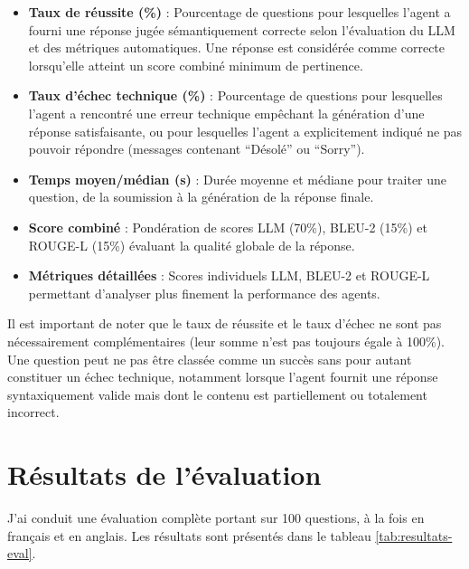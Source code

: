 \documentclass[a4paper,11pt]{article}
\begin{document}
\begin{itemize}
    \item \textbf{Taux de réussite (\%)} : Pourcentage de questions pour lesquelles l'agent a fourni une réponse jugée sémantiquement correcte selon l'évaluation du LLM et des métriques automatiques. Une réponse est considérée comme correcte lorsqu'elle atteint un score combiné minimum de pertinence.
    
    \item \textbf{Taux d'échec technique (\%)} : Pourcentage de questions pour lesquelles l'agent a rencontré une erreur technique empêchant la génération d'une réponse satisfaisante, ou pour lesquelles l'agent a explicitement indiqué ne pas pouvoir répondre (messages contenant \enquote{Désolé} ou \enquote{Sorry}).
    
    \item \textbf{Temps moyen/médian (s)} : Durée moyenne et médiane pour traiter une question, de la soumission à la génération de la réponse finale.
    
    \item \textbf{Score combiné} : Pondération de scores LLM (70\%), BLEU-2 (15\%) et ROUGE-L (15\%) évaluant la qualité globale de la réponse.
    
    \item \textbf{Métriques détaillées} : Scores individuels LLM, BLEU-2 et ROUGE-L permettant d'analyser plus finement la performance des agents.
\end{itemize}

Il est important de noter que le taux de réussite et le taux d'échec ne sont pas nécessairement complémentaires (leur somme n'est pas toujours égale à 100\%). Une question peut ne pas être classée comme un succès sans pour autant constituer un échec technique, notamment lorsque l'agent fournit une réponse syntaxiquement valide mais dont le contenu est partiellement ou totalement incorrect.


\section{Résultats de l'évaluation}
\label{sec:resultats}


J'ai conduit une évaluation complète portant sur 100 questions, à la fois en français et en anglais. Les résultats sont présentés dans le tableau \ref{tab:resultats-eval}.
\end{document}
